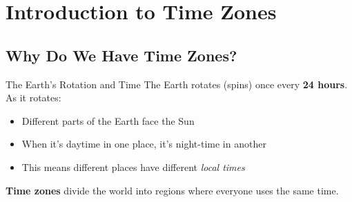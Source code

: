 \documentclass[12pt,a4paper]{article}
\begin{document}
\newpage

\section{Introduction to Time Zones}

\subsection{Why Do We Have Time Zones?}

\begin{conceptbox}{The Earth's Rotation and Time}
The Earth rotates (spins) once every \textbf{24 hours}. As it rotates:
\begin{itemize}[leftmargin=*]
\item Different parts of the Earth face the Sun
\item When it's daytime in one place, it's night-time in another
\item This means different places have different \textit{local times}
\end{itemize}

\begin{center}
\end{center}

\textbf{Time zones} divide the world into regions where everyone uses the same time.
\end{conceptbox}
\end{document}
